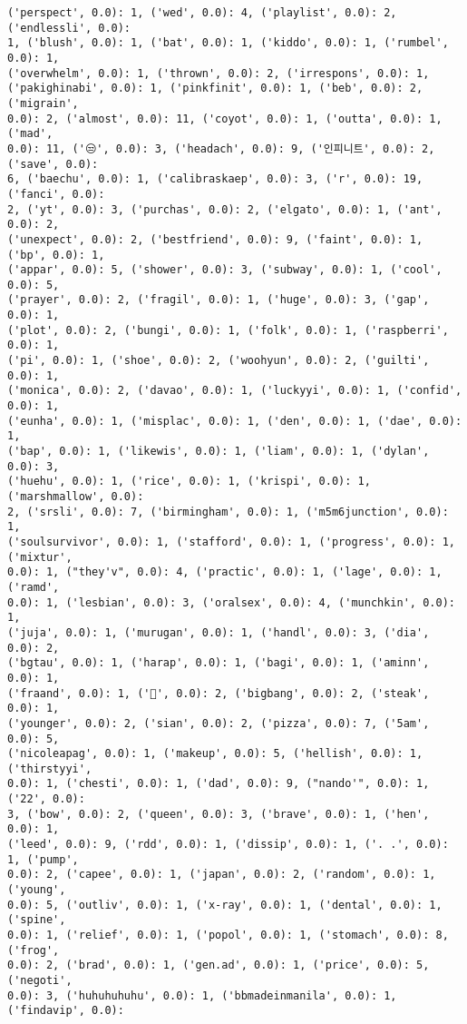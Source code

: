 \documentclass[11pt]{article}
\begin{document}
\begin{Verbatim}[commandchars=\\\{\}]
('perspect', 0.0): 1, ('wed', 0.0): 4, ('playlist', 0.0): 2, ('endlessli', 0.0):
1, ('blush', 0.0): 1, ('bat', 0.0): 1, ('kiddo', 0.0): 1, ('rumbel', 0.0): 1,
('overwhelm', 0.0): 1, ('thrown', 0.0): 2, ('irrespons', 0.0): 1,
('pakighinabi', 0.0): 1, ('pinkfinit', 0.0): 1, ('beb', 0.0): 2, ('migrain',
0.0): 2, ('almost', 0.0): 11, ('coyot', 0.0): 1, ('outta', 0.0): 1, ('mad',
0.0): 11, ('😒', 0.0): 3, ('headach', 0.0): 9, ('인피니트', 0.0): 2, ('save', 0.0):
6, ('baechu', 0.0): 1, ('calibraskaep', 0.0): 3, ('r', 0.0): 19, ('fanci', 0.0):
2, ('yt', 0.0): 3, ('purchas', 0.0): 2, ('elgato', 0.0): 1, ('ant', 0.0): 2,
('unexpect', 0.0): 2, ('bestfriend', 0.0): 9, ('faint', 0.0): 1, ('bp', 0.0): 1,
('appar', 0.0): 5, ('shower', 0.0): 3, ('subway', 0.0): 1, ('cool', 0.0): 5,
('prayer', 0.0): 2, ('fragil', 0.0): 1, ('huge', 0.0): 3, ('gap', 0.0): 1,
('plot', 0.0): 2, ('bungi', 0.0): 1, ('folk', 0.0): 1, ('raspberri', 0.0): 1,
('pi', 0.0): 1, ('shoe', 0.0): 2, ('woohyun', 0.0): 2, ('guilti', 0.0): 1,
('monica', 0.0): 2, ('davao', 0.0): 1, ('luckyyi', 0.0): 1, ('confid', 0.0): 1,
('eunha', 0.0): 1, ('misplac', 0.0): 1, ('den', 0.0): 1, ('dae', 0.0): 1,
('bap', 0.0): 1, ('likewis', 0.0): 1, ('liam', 0.0): 1, ('dylan', 0.0): 3,
('huehu', 0.0): 1, ('rice', 0.0): 1, ('krispi', 0.0): 1, ('marshmallow', 0.0):
2, ('srsli', 0.0): 7, ('birmingham', 0.0): 1, ('m5m6junction', 0.0): 1,
('soulsurvivor', 0.0): 1, ('stafford', 0.0): 1, ('progress', 0.0): 1, ('mixtur',
0.0): 1, ("they'v", 0.0): 4, ('practic', 0.0): 1, ('lage', 0.0): 1, ('ramd',
0.0): 1, ('lesbian', 0.0): 3, ('oralsex', 0.0): 4, ('munchkin', 0.0): 1,
('juja', 0.0): 1, ('murugan', 0.0): 1, ('handl', 0.0): 3, ('dia', 0.0): 2,
('bgtau', 0.0): 1, ('harap', 0.0): 1, ('bagi', 0.0): 1, ('aminn', 0.0): 1,
('fraand', 0.0): 1, ('😬', 0.0): 2, ('bigbang', 0.0): 2, ('steak', 0.0): 1,
('younger', 0.0): 2, ('sian', 0.0): 2, ('pizza', 0.0): 7, ('5am', 0.0): 5,
('nicoleapag', 0.0): 1, ('makeup', 0.0): 5, ('hellish', 0.0): 1, ('thirstyyi',
0.0): 1, ('chesti', 0.0): 1, ('dad', 0.0): 9, ("nando'", 0.0): 1, ('22', 0.0):
3, ('bow', 0.0): 2, ('queen', 0.0): 3, ('brave', 0.0): 1, ('hen', 0.0): 1,
('leed', 0.0): 9, ('rdd', 0.0): 1, ('dissip', 0.0): 1, ('. .', 0.0): 1, ('pump',
0.0): 2, ('capee', 0.0): 1, ('japan', 0.0): 2, ('random', 0.0): 1, ('young',
0.0): 5, ('outliv', 0.0): 1, ('x-ray', 0.0): 1, ('dental', 0.0): 1, ('spine',
0.0): 1, ('relief', 0.0): 1, ('popol', 0.0): 1, ('stomach', 0.0): 8, ('frog',
0.0): 2, ('brad', 0.0): 1, ('gen.ad', 0.0): 1, ('price', 0.0): 5, ('negoti',
0.0): 3, ('huhuhuhuhu', 0.0): 1, ('bbmadeinmanila', 0.0): 1, ('findavip', 0.0):

\end{Verbatim}
\end{document}
